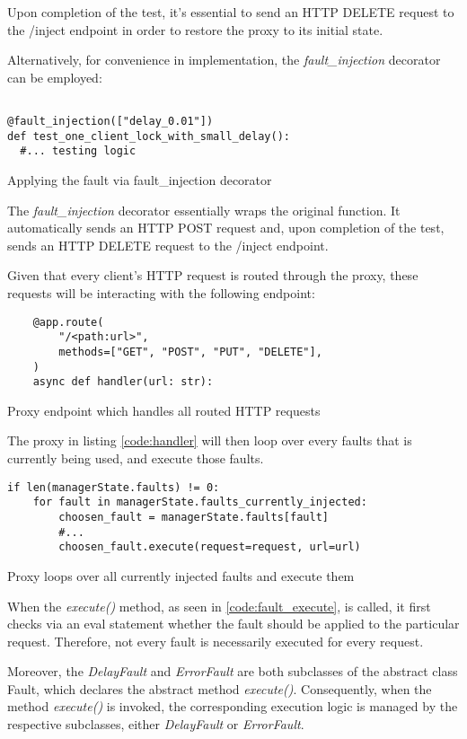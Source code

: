 Upon completion of the test, it's essential to send an HTTP DELETE request to the /inject endpoint in order to restore the proxy to its initial state.

Alternatively, for convenience in implementation, the \textit{fault\_injection} decorator can be employed:

\begin{listing}[H]
  \begin{verbatim}
    
@fault_injection(["delay_0.01"])
def test_one_client_lock_with_small_delay():
  #... testing logic
  \end{verbatim}
  \caption{Applying the fault via fault\_injection decorator}
\end{listing}

The \textit{fault\_injection} decorator essentially wraps the original function. It automatically sends an HTTP POST request and, upon completion of the test, sends an HTTP DELETE request to the /inject endpoint. 

Given that every client's HTTP request is routed through the proxy, these requests will be interacting with the following endpoint:
\begin{listing}[!ht]
  \begin{verbatim}
    @app.route(
        "/<path:url>",
        methods=["GET", "POST", "PUT", "DELETE"],
    )
    async def handler(url: str):
  \end{verbatim}
  \caption{Proxy endpoint which handles all routed HTTP requests}
  \label{code:handler}
\end{listing}

The proxy in listing \ref{code:handler} will then loop over every faults that is currently being used, and execute
those faults.

\begin{listing}[!ht]
  \begin{verbatim}
if len(managerState.faults) != 0:
    for fault in managerState.faults_currently_injected:
        choosen_fault = managerState.faults[fault]
        #...
        choosen_fault.execute(request=request, url=url)
  \end{verbatim}
  \caption{Proxy loops over all currently injected faults and execute them}
  \label{code:fault_execute}
\end{listing}

When the \textit{execute()} method, as seen in \ref{code:fault_execute}, is called, it 
first checks via an eval statement whether the fault should be applied to the 
particular request. Therefore, not every fault is necessarily executed for every request.

Moreover, the \textit{DelayFault} and \textit{ErrorFault} are both subclasses of 
the abstract class Fault, which declares the abstract method \textit{execute()}. 
Consequently, when the method \textit{execute()} is invoked, the corresponding execution logic is managed by the respective subclasses, either \textit{DelayFault} or \textit{ErrorFault}.
